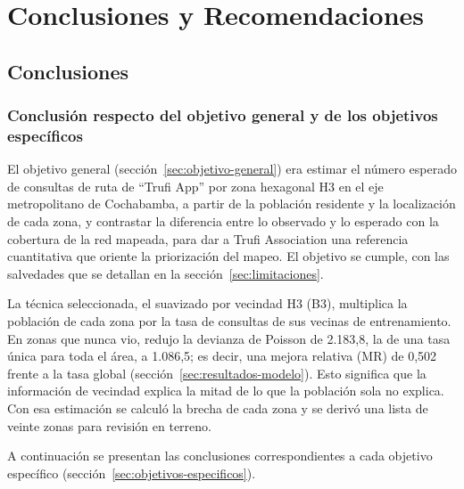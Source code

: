 \chapter{Conclusiones y Recomendaciones}
\label{cap:conclusiones}

\section{Conclusiones}
\label{sec:conclusiones}

\subsection{Conclusión respecto del objetivo general y de los objetivos específicos}
\label{sec:conclusion-general}

El objetivo general (sección~\ref{sec:objetivo-general}) era estimar el número esperado de
consultas de ruta de ``Trufi App'' por zona hexagonal H3 en el eje metropolitano de Cochabamba,
a partir de la población residente y la localización de cada zona, y contrastar la
diferencia entre lo observado y lo esperado con la cobertura de la red mapeada, para dar a
Trufi Association una referencia cuantitativa que oriente la priorización del mapeo. El
objetivo se cumple, con las salvedades que se detallan en la
sección~\ref{sec:limitaciones}.

La técnica seleccionada, el suavizado por vecindad H3 (B3), multiplica la población de cada
zona por la tasa de consultas de sus vecinas de entrenamiento. En zonas que nunca vio, redujo
la devianza de Poisson de 2.183,8, la de una tasa única para toda el área, a 1.086,5; es
decir, una mejora relativa (MR) de 0,502 frente a la tasa global
(sección~\ref{sec:resultados-modelo}).
Esto significa que la información de vecindad explica la mitad de lo que la población sola
no explica. Con esa estimación se calculó la brecha de cada zona y se derivó una lista de
veinte zonas para revisión en terreno.

A continuación se presentan las conclusiones correspondientes a cada objetivo específico
(sección~\ref{sec:objetivos-especificos}).

